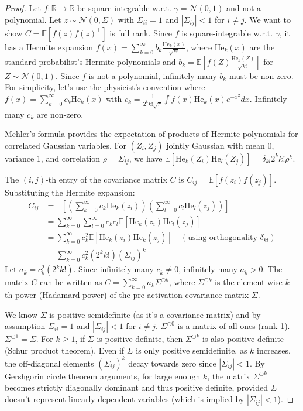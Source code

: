 \documentclass{article}
\newcommand{\R}{\mathbb{R}}
\newcommand{\E}{\mathbb{E}}
\newcommand{\He}{\mathrm{He}}
\numberwithin{figure}{section}
\begin{document}
\begin{proof} Let $f:\R\to\R$ be square-integrable w.r.t. $\gamma = \mathcal{N}(0,1)$ and not a polynomial. Let $z \sim \mathcal{N}(0, \Sigma)$ with $\Sigma_{ii}=1$ and $|\Sigma_{ij}| < 1$ for $i \neq j$. We want to show $C = \E[f(z)f(z)^\top]$ is full rank.
    Since $f$ is square-integrable w.r.t. $\gamma$, it has a Hermite expansion $f(x) = \sum_{k=0}^{\infty} b_k \frac{\He_k(x)}{\sqrt{k!}}$, where $\He_k(x)$ are the standard probabilist's Hermite polynomials and $b_k = \E[f(Z) \frac{\He_k(Z)}{\sqrt{k!}}]$ for $Z \sim \mathcal{N}(0,1)$. Since $f$ is not a polynomial, infinitely many $b_k$ must be non-zero. For simplicity, let's use the physicist's convention where $f(x) = \sum_{k=0}^{\infty} c_k \He_k(x)$ with $c_k = \frac{1}{2^k k! \sqrt{\pi}} \int f(x) \He_k(x) e^{-x^2} dx$. Infinitely many $c_k$ are non-zero.

    Mehler's formula \citep{mehler1866ueber, erdelyi1953higher} provides the expectation of products of Hermite polynomials for correlated Gaussian variables. For $(Z_i, Z_j)$ jointly Gaussian with mean 0, variance 1, and correlation $\rho = \Sigma_{ij}$, we have $\E[\He_k(Z_i) \He_l(Z_j)] = \delta_{kl} 2^k k! \rho^k$.

    The $(i, j)$-th entry of the covariance matrix $C$ is $C_{ij} = \E[f(z_i) f(z_j)]$. Substituting the Hermite expansion:
    \begin{align*}
    C_{ij} &= \E\left[ \left( \sum_{k=0}^{\infty} c_k \He_k(z_i) \right) \left( \sum_{l=0}^{\infty} c_l \He_l(z_j) \right) \right] \\
    &= \sum_{k=0}^{\infty} \sum_{l=0}^{\infty} c_k c_l \E[\He_k(z_i) \He_l(z_j)] \\
    &= \sum_{k=0}^{\infty} c_k^2 \E[\He_k(z_i) \He_k(z_j)] \quad (\text{using orthogonality } \delta_{kl}) \\
    &= \sum_{k=0}^{\infty} c_k^2 (2^k k!) (\Sigma_{ij})^k
    \end{align*}
    Let $a_k = c_k^2 (2^k k!)$. Since infinitely many $c_k \neq 0$, infinitely many $a_k > 0$. The matrix $C$ can be written as $C = \sum_{k=0}^{\infty} a_k \Sigma^{\odot k}$, where $\Sigma^{\odot k}$ is the element-wise $k$-th power (Hadamard power) of the pre-activation covariance matrix $\Sigma$.

    We know $\Sigma$ is positive semidefinite (as it's a covariance matrix) and by assumption $\Sigma_{ii}=1$ and $|\Sigma_{ij}|<1$ for $i \neq j$. $\Sigma^{\odot 0}$ is a matrix of all ones (rank 1). $\Sigma^{\odot 1} = \Sigma$. For $k \ge 1$, if $\Sigma$ is positive definite, then $\Sigma^{\odot k}$ is also positive definite (Schur product theorem). Even if $\Sigma$ is only positive semidefinite, as $k$ increases, the off-diagonal elements $(\Sigma_{ij})^k$ decay towards zero since $|\Sigma_{ij}|<1$. By Gershgorin circle theorem arguments, for large enough $k$, the matrix $\Sigma^{\odot k}$ becomes strictly diagonally dominant and thus positive definite, provided $\Sigma$ doesn't represent linearly dependent variables (which is implied by $|\Sigma_{ij}|<1$).


\end{proof}
\end{document}
